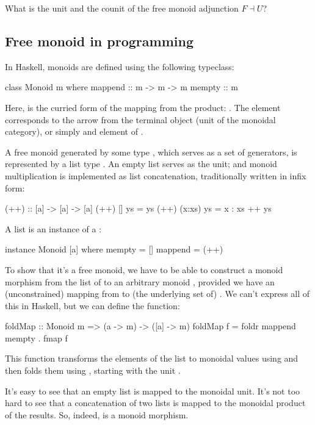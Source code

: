 \documentclass[DaoFP]{subfiles}
\begin{document}
\begin{exercise}
What is the unit and the counit of the free monoid adjunction $F \dashv U$?
\end{exercise}

\subsection{Free monoid in programming}

In Haskell, monoids are defined using the following typeclass:
\begin{haskell}
class Monoid m where
  mappend :: m -> m -> m
  mempty  :: m
\end{haskell}
Here,  is the curried form of the mapping from the product: . The  element corresponds to the arrow from the terminal object (unit of the monoidal category), or simply and element of . 

A free monoid generated by some type , which serves as a set of generators, is represented by a list type \hask{[a]}. An empty list serves as the unit; and monoid multiplication is implemented as list concatenation, traditionally written in infix form:
\begin{haskell}
(++) :: [a] -> [a] -> [a]
(++) []     ys = ys
(++) (x:xs) ys = x : xs ++ ys
\end{haskell}
A list is an instance of a :
\begin{haskell}
instance Monoid [a] where
  mempty = []
  mappend = (++)
\end{haskell}

To show that it's a free monoid, we have to be able to construct a monoid morphism from the list of  to an arbitrary monoid , provided we have an (unconstrained) mapping from  to (the underlying set of) . We can't express all of this in Haskell, but we can define the function:
\begin{haskell}
foldMap :: Monoid m => (a -> m) -> ([a] -> m)
foldMap f = foldr mappend mempty . fmap f
\end{haskell}
This function transforms the elements of the list to monoidal values using  and then folds them using , starting with the unit . 

It's easy to see that an empty list is mapped to the monoidal unit. It's not too hard to see that a concatenation of two lists is mapped to the monoidal product of the results. So, indeed,  is a monoid morphism. 
\end{document}
